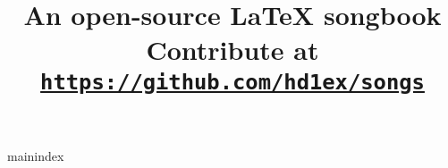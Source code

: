\documentclass[landscape, 11pt, a4paper, oneside, ngerman]{book}
\title{
    An open-source LaTeX songbook
    \\\vspace{1em}\large
    Contribute at \texttt{\href{https://github.com/hd1ex/songs}{https://github.com/hd1ex/songs}}
}
\author{Made by Alex and friends \ensuremath\heartsuit}
\begin{document}
    \maketitle


    \begin{songs}{mainindex}


    \end{songs}
\end{document}
